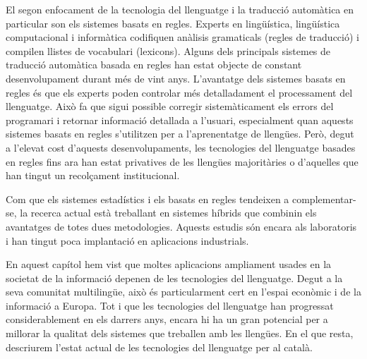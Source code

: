 \begin{multicols}{2}
El segon enfocament de la tecnologia del llenguatge i la traducció automàtica en particular son els sistemes basats en regles. Experts en lingüística, lingüística computacional i informàtica codifiquen anàlisis gramaticals (regles de traducció) i compilen llistes de vocabulari (lexicons). Alguns dels principals sistemes de traducció automàtica basada en regles han estat objecte de constant desenvolupament durant més de vint anys. L’avantatge dels sistemes basats en regles és que els experts poden controlar més detalladament el processament del llenguatge. Això fa que sigui possible corregir sistemàticament els errors del programari i retornar informació detallada a l’usuari, especialment quan aquests sistemes basats en regles s’utilitzen per a l’aprenentatge de llengües. Però, degut a l'elevat cost d'aquests desenvolupaments, les tecnologies del llenguatge basades en regles fins ara han estat privatives de les llengües majoritàries o d'aquelles que han tingut un recolçament institucional.

	Com que els sistemes estadístics i els basats en regles tendeixen a complementar-se, la recerca actual està treballant en sistemes híbrids que combinin els avantatges de totes dues metodologies. Aquests estudis són encara als laboratoris i han tingut poca implantació en aplicacions industrials.
	
	En aquest capítol hem vist que moltes aplicacions ampliament usades en la societat de la informació depenen de les tecnologies del llenguatge. Degut a la seva comunitat multilingüe, això és particularment cert en l'espai econòmic i de la informació a Europa. Tot i que les tecnologies del llenguatge han progressat considerablement en els darrers anys, encara hi ha un gran potencial per a millorar la qualitat dels sistemes que treballen amb les llengües. En el que resta, descriurem l'estat actual de les tecnologies del llenguatge per al català. 
\end{multicols}

\clearpage



